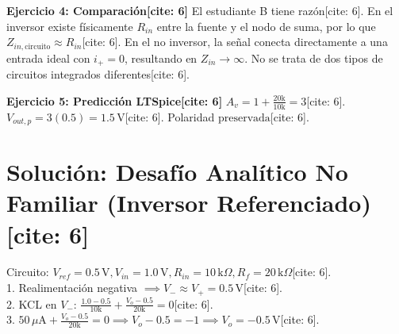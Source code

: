 \documentclass[11pt, a4paper]{article}
\begin{document}
\vspace{0.3cm}
\textbf{Ejercicio 4: Comparación[cite: 6]}
El estudiante B tiene razón[cite: 6]. En el inversor existe físicamente $R_{in}$ entre la fuente y el nodo de suma, por lo que $Z_{in, \text{circuito}} \approx R_{in}$[cite: 6]. En el no inversor, la señal conecta directamente a una entrada ideal con $i_+ = 0$, resultando en $Z_{in} \rightarrow \infty$. No se trata de dos tipos de circuitos integrados diferentes[cite: 6].

\vspace{0.3cm}
\textbf{Ejercicio 5: Predicción LTSpice[cite: 6]}
$A_v = 1 + \frac{20\text{k}}{10\text{k}} = \boxed{3}$[cite: 6]. $V_{out, p} = 3(0.5) = \boxed{1.5\,\text{V}}$[cite: 6]. Polaridad $\boxed{\text{preservada}}$[cite: 6].

\section*{Solución: Desafío Analítico No Familiar (Inversor Referenciado)[cite: 6]}
Circuito: $V_{ref} = 0.5\,\text{V}, V_{in} = 1.0\,\text{V}, R_{in} = 10\,\text{k}\Omega, R_f = 20\,\text{k}\Omega$[cite: 6]. \\
1. Realimentación negativa $\implies V_- \approx V_+ = 0.5\,\text{V}$[cite: 6]. \\
2. KCL en $V_-$: $\frac{1.0 - 0.5}{10\text{k}} + \frac{V_o - 0.5}{20\text{k}} = 0$[cite: 6]. \\
3. $50\,\mu\text{A} + \frac{V_o - 0.5}{20\text{k}} = 0 \implies V_o - 0.5 = -1 \implies \boxed{V_o = -0.5\,\text{V}}$[cite: 6].
\end{document}
